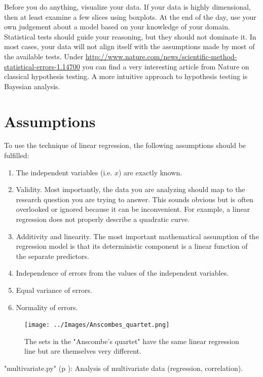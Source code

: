 Before you do anything, visualize your data. If your data is highly dimensional, then at least examine a few slices using boxplots. At the end of the day, use your own judgement about a model based on your knowledge of your domain. Statistical tests should guide your reasoning, but they should not dominate it. In most cases, your data will not align itself with the assumptions made by most of the available tests. Under \url{http://www.nature.com/news/scientific-method-statistical-errors-1.14700} you can find a very interesting article from Nature on classical hypothesis testing. A more intuitive approach to hypothesis testing is Bayesian analysis.

\section{Assumptions} \label{sec:Assumptions}

To use the technique of linear regression, the following assumptions should be fulfilled:

\begin{enumerate}
  \item The independent variables (i.e. $x$) are exactly known.
  \item Validity. Most importantly, the data you are analyzing should map to the research question you are trying to answer. This sounds obvious but is often overlooked or ignored because it can be inconvenient. For example, a linear regression does not properly describe a quadratic curve.
  \item Additivity and linearity. The most important mathematical assumption of the regression model is that its deterministic component is a linear function of the separate predictors.
  \item Independence of errors from the values of the independent variables.
  \item Equal variance of errors.
  \item Normality of errors.
\end{enumerate}

\begin{figure}
  \centering
  \texttt{[image: ../Images/Anscombes\_quartet.png]}\\
  \caption{The sets in the "Anscombe's quartet" have the same linear regression line but are themselves very different.}
\end{figure}

\PyImg "multivariate.py" (p \pageref{py:multivariate}): Analysis of multivariate data (regression, correlation).

